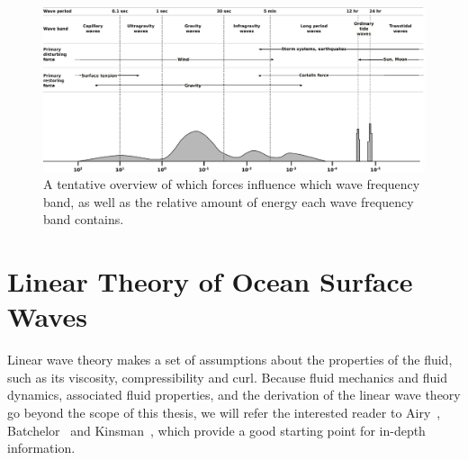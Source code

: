 \begin{figure}[tb]
	\centering
	\includegraphics[width=\textwidth]{figures/SurfaceWavesEnergy}
	\caption{A tentative overview of which forces influence which wave 
frequency band, as well as the relative amount of energy
each wave frequency band contains.}
	\label{fig:surface_waves_energy}
\end{figure}

\section{Linear Theory of Ocean Surface Waves}
\label{sec:linear_theory_ocean_waves}
Linear wave theory makes a set of assumptions about the properties of the fluid, such as its viscosity,
compressibility and curl. Because fluid mechanics and fluid dynamics, associated fluid properties, and the derivation
of the linear wave theory go beyond the scope of this thesis, we will refer the interested reader
to Airy~\cite{book:airy1845tides}, Batchelor~\cite{book:batchelor2000introduction}
and Kinsman~\cite{book:kinsman2002wind}, which provide a good starting point for in-depth information.\\

